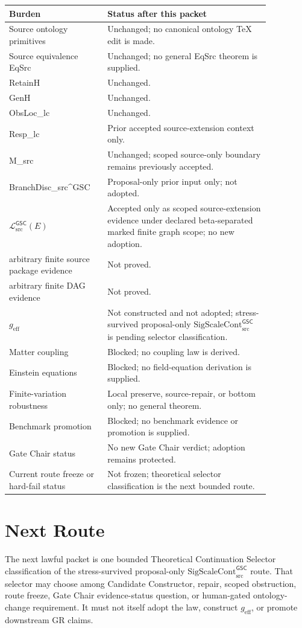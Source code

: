 \documentclass[11pt]{article}
\newcommand{\MetricData}{\mathcal{L}_{\mathrm{src}}^{\mathsf{GSC}}}
\newcommand{\geff}{g_{\mathrm{eff}}}
\newcommand{\SigScaleCont}{\mathrm{SigScaleCont}_{\mathrm{src}}^{\mathsf{GSC}}}
\begin{document}
\begin{longtable}{p{0.30\linewidth}p{0.56\linewidth}}
\toprule
Burden & Status after this packet \\
\midrule
Source ontology primitives & Unchanged; no canonical ontology TeX edit is
made. \\
Source equivalence EqSrc & Unchanged; no general EqSrc theorem is supplied. \\
RetainH & Unchanged. \\
GenH & Unchanged. \\
ObsLoc\_lc & Unchanged. \\
Resp\_lc & Prior accepted source-extension context only. \\
M\_src & Unchanged; scoped source-only boundary remains previously accepted. \\
BranchDisc\_src\textasciicircum GSC & Proposal-only prior input only; not
adopted. \\
\(\MetricData(E)\) & Accepted only as scoped source-extension evidence under
declared beta-separated marked finite graph scope; no new adoption. \\
arbitrary finite source package evidence & Not proved. \\
arbitrary finite DAG evidence & Not proved. \\
\(\geff\) & Not constructed and not adopted; stress-survived proposal-only
\(\SigScaleCont\) is pending selector classification. \\
Matter coupling & Blocked; no coupling law is derived. \\
Einstein equations & Blocked; no field-equation derivation is supplied. \\
Finite-variation robustness & Local preserve, source-repair, or bottom only;
no general theorem. \\
Benchmark promotion & Blocked; no benchmark evidence or promotion is supplied. \\
Gate Chair status & No new Gate Chair verdict; adoption remains protected. \\
Current route freeze or hard-fail status & Not frozen; theoretical selector
classification is the next bounded route. \\
\bottomrule
\end{longtable}

\section{Next Route}

The next lawful packet is one bounded Theoretical Continuation Selector
classification of the stress-survived proposal-only \(\SigScaleCont\) route.
That selector may choose among Candidate Constructor, repair, scoped
obstruction, route freeze, Gate Chair evidence-status question, or
human-gated ontology-change requirement. It must not itself adopt the law,
construct \(\geff\), or promote downstream GR claims.
\end{document}
